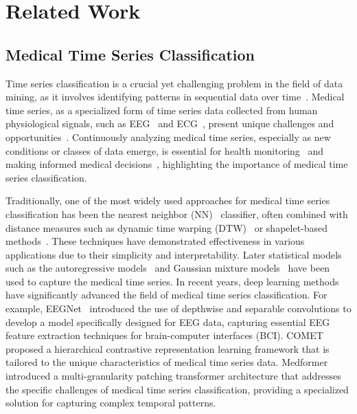 \section{Related Work}
\subsection{Medical Time Series Classification}
Time series classification is a crucial yet challenging problem in the field of data mining, as it involves identifying patterns in sequential data over time~\cite{tsc_survey_2019}. 
Medical time series, as a specialized form of time series data collected from human physiological signals, such as EEG~\cite{YangW023} and ECG~\cite{KiyassehZC21}, present unique challenges and opportunities~\cite{JafariSKBSLGA23}. Continuously analyzing medical time series, especially as new conditions or classes of data emerge, is essential for health monitoring~\cite{WangSY23} and making informed medical decisions~\cite{AdmassB24}, highlighting the importance of medical time series classification.

Traditionally, one of the most widely used approaches for medical time series classification has been the nearest neighbor (NN)~\cite{LinesB15} classifier, often combined with distance measures such as dynamic time warping (DTW)~\cite{BagnallLBLK17} or shapelet-based methods~\cite{BostromB17}. These techniques have demonstrated effectiveness in various applications due to their simplicity and interpretability. Later statistical models such as the autoregressive models~\cite{schaffer2021interrupted} and Gaussian mixture models~\cite{vincent2010spatially} have been used to capture the medical time series.
In recent years, deep learning methods have significantly advanced the field of medical time series classification. For example, EEGNet~\cite{eegnet_2016} introduced the use of depthwise and separable convolutions to develop a model specifically designed for EEG data, capturing essential EEG feature extraction techniques for brain-computer interfaces (BCI). COMET~\cite{comet_2023} proposed a hierarchical contrastive representation learning framework that is tailored to the unique characteristics of medical time series data. Medformer~\cite{medformer_2024} introduced a multi-granularity patching transformer architecture that addresses the specific challenges of medical time series classification, providing a specialized solution for capturing complex temporal patterns.

